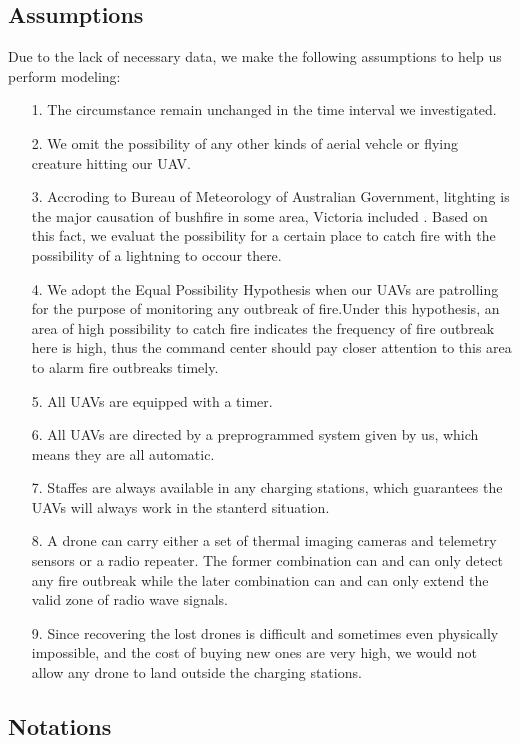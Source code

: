 \documentclass[13pt]{ctexart} %
\begin{document}
\subsection{Assumptions}
Due to the lack of necessary data, we make the following assumptions to help us perform modeling:

\begin{itemize}[itemsep=0.3ex, leftmargin=1.2cm]
    \item[1.] The circumstance remain unchanged in the time interval we investigated.
    \item[2.] We omit the possibility of any other kinds of aerial vehcle or flying creature hitting our UAV.
    \item[3.] Accroding to Bureau of Meteorology of Australian Government, litghting is the major causation of bushfire in some area, Victoria included \cite{au-gov-weather}. Based on this fact, we evaluat the possibility for a certain place to catch fire with the possibility of a lightning to occour there.
    \item[4.]  We adopt the Equal Possibility Hypothesis when our UAVs are patrolling for the purpose of monitoring any outbreak of fire.Under this hypothesis, an area of high possibility to catch fire indicates the frequency of fire outbreak here is high, thus the command center should pay closer attention to this area to alarm fire outbreaks timely.
    \item[5.] All UAVs are equipped with a timer.
    \item[6.] All UAVs are directed by a preprogrammed system given by us, which means they are all automatic.
    \item[7.] Staffes are always available in any charging stations, which guarantees the UAVs will always work in the stanterd situation.
    \item[8.] A drone can carry either a set of thermal imaging cameras and telemetry sensors or a radio repeater. The former combination can and can only detect any fire outbreak while the later combination can and can only extend the valid zone of radio wave signals.
   \item[9.]\label{ampt09} Since recovering the lost drones is difficult and sometimes even physically impossible, and the cost of buying new ones are very high, we would not allow any drone to land outside the charging stations.

\end{itemize}
\subsection{Notations}
\end{document}
